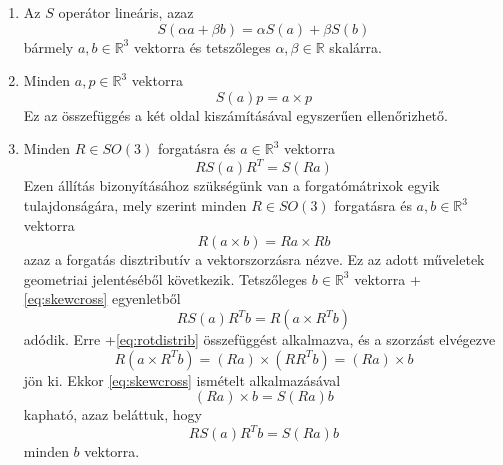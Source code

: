\documentclass[12pt,a4paper]{report}
\theoremstyle{remark}
\theoremstyle{definition}
\begin{document}
\begin{enumerate}[label=\arabic*.]
\item Az $S$ operátor lineáris, azaz
    \begin{equation}
    S(\alpha a + \beta b) = \alpha S(a) + \beta S(b)
    \end{equation}
    bármely $a, b \in \mathbb{R}^3$ vektorra és tetszőleges $\alpha, \beta \in \mathbb{R}$ skalárra.
\item Minden $a, p \in \mathbb{R}^3$ vektorra
    \begin{equation} \label{eq:skewcross}
    S(a)p = a \times p
    \end{equation}
    Ez az összefüggés a két oldal kiszámításával egyszerűen ellenőrizhető.
\item Minden $R \in SO(3)$ forgatásra és $a \in \mathbb{R}^3$ vektorra
    \begin{equation} \label{eq:skewtransf}
    RS(a)R^T = S(Ra)
    \end{equation}
    Ezen állítás bizonyításához szükségünk van a forgatómátrixok egyik tulajdonságára, mely szerint minden 
    $R \in SO(3)$ forgatásra és $a, b \in \mathbb{R}^3$ vektorra
    \begin{equation} \label{eq:rotdistrib}
    R(a \times b) = Ra \times Rb
    \end{equation}
    azaz a forgatás disztributív a vektorszorzásra nézve. Ez az adott műveletek geometriai jelentéséből 
    következik. Tetszőleges $b \in \mathbb{R}^3$ vektorra \az+\eqref{eq:skewcross} egyenletből
    \begin{equation}
    RS(a)R^Tb = R(a \times R^Tb)
    \end{equation}
    adódik. Erre \az+\eqref{eq:rotdistrib} összefüggést alkalmazva, és a szorzást elvégezve
    \begin{equation}
    R(a \times R^Tb) = (Ra) \times (RR^Tb) = (Ra) \times b
    \end{equation}
    jön ki. Ekkor \eqref{eq:skewcross} ismételt alkalmazásával
    \begin{equation}
    (Ra) \times b = S(Ra)b
    \end{equation}
    kapható, azaz beláttuk, hogy
    \begin{equation}
    RS(a)R^Tb = S(Ra)b
    \end{equation}
    minden $b$ vektorra.
\end{enumerate}
\end{document}
